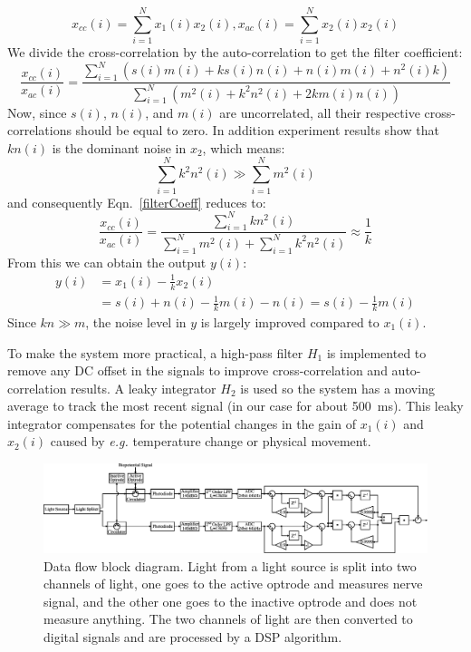 $$x_{cc}(i)=\displaystyle\sum_{i=1}^{N} x_1(i)x_2(i), x_{ac}(i)=\displaystyle\sum_{i=1}^{N} x_2(i)x_2(i)$$
We divide the cross-correlation by the auto-correlation to get the filter coefficient:
\begin{equation}
\label{filterCoeff}
    \frac{x_{cc}(i)}{x_{ac}(i)} =\frac{\displaystyle\sum_{i=1}^{N} \left(s(i)m(i)+ks(i)n(i)+n(i)m(i)+n^2(i)k\right)}{\displaystyle\sum_{i=1}^{N} \left(m^2(i)+k^2n^2(i)+2km(i)n(i)\right)}
\end{equation}
Now, since $s(i)$, $n(i)$, and $m(i)$ are uncorrelated, all their respective cross-correlations should be equal to zero. In addition experiment results show that $kn(i)$ is the dominant noise in $x_2$, which means: 
$$
\sum_{i=1}^{N} k^2n^2(i) \gg \sum_{i=1}^{N} m^2(i)
$$
and consequently Eqn.~\ref{filterCoeff} reduces to:
$$
\frac{x_{cc}(i)}{x_{ac}(i)}=\frac{\displaystyle\sum_{i=1}^{N} kn^2(i)}{\displaystyle\sum_{i=1}^{N} m^2(i) + \displaystyle\sum_{i=1}^{N} k^2n^2(i)} \approx \frac{1}{k} 
$$
From this we can obtain the output $y(i)$:
\begin{align*}
    y(i)&=x_1(i)-\frac{1}{k}x_2(i) \\
    &=s(i)+n(i)-\frac{1}{k}m(i)-n(i)=s(i)-\frac{1}{k}m(i)
\end{align*}
Since $kn \gg m$, the noise level in $y$ is largely improved compared to $x_1(i)$.

To make the system more practical, a high-pass filter $H_1$ is implemented to remove any DC offset in the signals to improve cross-correlation and auto-correlation results.  A leaky integrator $H_2$ is used so the system has a moving average to track the most recent signal (in our case for about \qty{500}{ms}).  This leaky integrator compensates for the potential changes in the gain of $x_1(i)$ and $x_2(i)$ caused by {\em e.g.} temperature change or physical movement.

\begin{figure}[htbp]
\centerline{\includegraphics[width=0.9\linewidth]{4-ANC_Sys/DataFlow.pdf}}
\caption{Data flow block diagram.  Light from a light source is split into two channels of light, one goes to the active optrode and measures nerve signal, and the other one goes to the inactive optrode and does not measure anything.  The two channels of light are then converted to digital signals and are processed by a DSP algorithm.}
\label{fig_DataFlow}
\end{figure}

